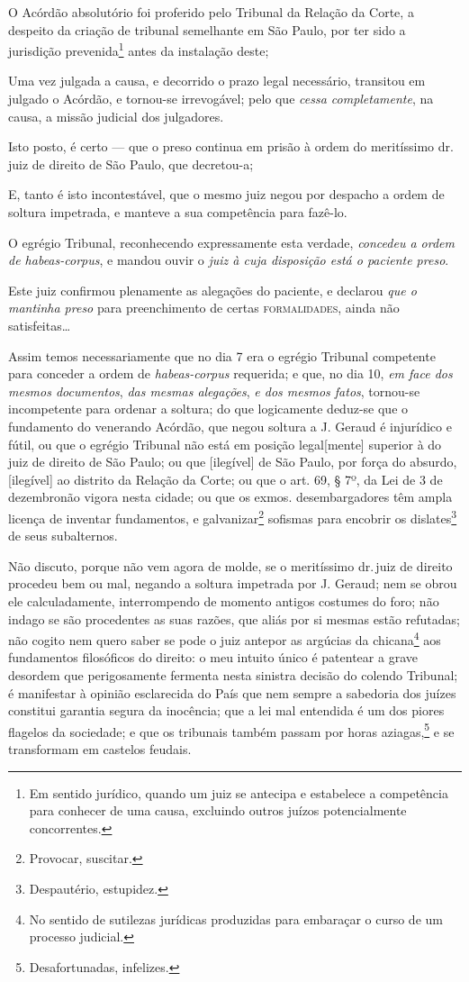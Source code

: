 O Acórdão absolutório foi proferido pelo Tribunal da Relação da Corte, a
despeito da criação de tribunal semelhante em São Paulo, por ter sido a
jurisdição prevenida\footnote{ Em sentido jurídico, quando um juiz se
  antecipa e estabelece a competência para conhecer de uma causa,
  excluindo outros juízos potencialmente concorrentes.} antes da
instalação deste;

Uma vez julgada a causa, e decorrido o prazo legal necessário, transitou
em julgado o Acórdão, e tornou-se irrevogável; pelo que \emph{cessa
completamente}, na causa, a missão judicial dos julgadores.

Isto posto, é certo --- que o preso continua em prisão à ordem do
meritíssimo dr.\,juiz de direito de São Paulo, que decretou-a;

E, tanto é isto incontestável, que o mesmo juiz negou por despacho a
ordem de soltura impetrada, e manteve a sua competência para fazê-lo.

O egrégio Tribunal, reconhecendo expressamente esta verdade,
\emph{concedeu a ordem de habeas-corpus}, e mandou ouvir o \emph{juiz à
cuja disposição está o paciente preso}.

Este juiz confirmou plenamente as alegações do paciente, e declarou
\emph{que o mantinha preso} para preenchimento de certas \textsc{formalidades},
ainda não satisfeitas\ldots{}

Assim temos necessariamente que no dia 7 era o egrégio Tribunal
competente para conceder a ordem de \emph{habeas-corpus} requerida; e
que, no dia 10, \emph{em face dos mesmos documentos}, \emph{das mesmas
alegações}, \emph{e dos mesmos fatos}, tornou-se incompetente para
ordenar a soltura; do que logicamente deduz-se que o fundamento do
venerando Acórdão, que negou soltura a J. Geraud é injurídico e fútil,
ou que o egrégio Tribunal não está em posição legal{[}mente{]} superior
à do juiz de direito de São Paulo; ou que {[}ilegível{]} de São Paulo, por
força do absurdo, {[}ilegível{]} ao distrito da Relação da Corte; ou que
o art. 69, § 7º, da Lei de 3 de dezembronão vigora nesta cidade; ou que
os exmos. desembargadores têm ampla licença de inventar fundamentos, e
galvanizar\footnote{ Provocar, suscitar.} sofismas para encobrir os
dislates\footnote{ Despautério, estupidez.} de seus subalternos.

Não discuto, porque não vem agora de molde, se o meritíssimo dr.\,juiz de
direito procedeu bem ou mal, negando a soltura impetrada por J. Geraud;
nem se obrou ele calculadamente, interrompendo de momento antigos
costumes do foro; não indago se são procedentes as suas razões, que
aliás por si mesmas estão refutadas; não cogito nem quero saber se pode
o juiz antepor as argúcias da chicana\footnote{ No sentido de sutilezas
  jurídicas produzidas para embaraçar o curso de um processo judicial.}
aos fundamentos filosóficos do direito: o meu intuito único é patentear
a grave desordem que perigosamente fermenta nesta sinistra decisão do
colendo Tribunal; é manifestar à opinião esclarecida do País que nem
sempre a sabedoria dos juízes constitui garantia segura da inocência;
que a lei mal entendida é um dos piores flagelos da sociedade; e que os
tribunais também passam por horas aziagas,\footnote{ Desafortunadas,
  infelizes.} e se transformam em castelos feudais.

